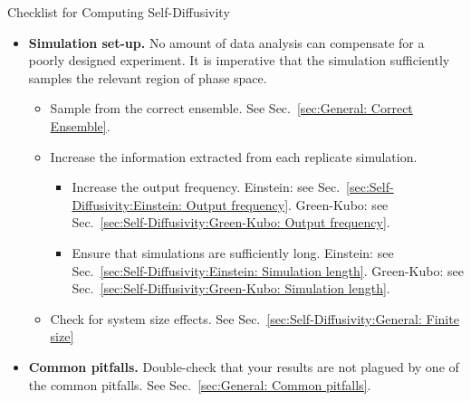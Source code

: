 \documentclass[9pt,bestpractices]{livecoms}
\begin{document}
\begin{Checklists*}[p!]
	\begin{checklist}{Checklist for Computing Self-Diffusivity}
		\begin{itemize}
			\item
			\textbf{Simulation set-up.} No amount of data analysis can compensate for a poorly designed experiment. It is imperative that the simulation sufficiently samples the relevant region of phase space.
			\vspace{-0.325\baselineskip} %
			\begin{itemize}
				\item Sample from the correct ensemble. See Sec.\ \ref{sec:General: Correct Ensemble}.
				\item Increase the information extracted from each replicate simulation.
				\begin{itemize}
					\item Increase the output frequency. Einstein: see Sec.\ \ref{sec:Self-Diffusivity:Einstein: Output frequency}. Green-Kubo: see Sec.\ \ref{sec:Self-Diffusivity:Green-Kubo: Output frequency}.
					\item Ensure that simulations are sufficiently long. Einstein: see Sec.\ \ref{sec:Self-Diffusivity:Einstein: Simulation length}. Green-Kubo: see Sec.\ \ref{sec:Self-Diffusivity:Green-Kubo: Simulation length}.
				\end{itemize}
				\item Check for system size effects. See Sec.\ \ref{sec:Self-Diffusivity:General: Finite size}
			\end{itemize}
			\vspace{-0.325\baselineskip} %
			
			\item
			\textbf{Common pitfalls.} Double-check that your results are not plagued by one of the common pitfalls. See Sec.\ \ref{sec:General: Common pitfalls}.
			

\end{itemize}
\end{checklist}
\end{Checklists*}
\end{document}
